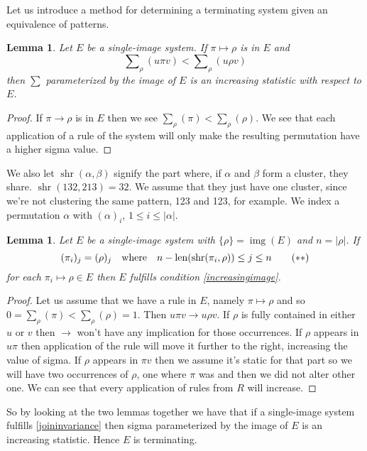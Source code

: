 \documentclass[openany, a4paper, 11pt, english]{article}
\newcommand{\patternrule}{ \mapsto \!}
\newtheorem{lemma}[theorem]{Lemma}
\theoremstyle{definition}
\DeclareMathOperator{\img}{img}
\DeclareMathOperator{\len}{len}
\DeclareMathOperator{\shr}{shr}
\begin{document}
Let us introduce a method for determining a terminating system given an
equivalence of patterns.

\begin{lemma}
    Let $E$ be a single-image system. If $\pi \patternrule \rho$ is in $E$ and 
    \[
        \sum\nolimits_\rho(u\pi v) < \sum\nolimits_\rho(u \rho v) \tag{$\ast$}
        \label{increasingimage}
    \]
    then $\sum$ parameterized by the image of $E$ is an increasing statistic
    with respect to $E$.
\end{lemma}
\begin{proof}
    If $\pi \to \rho$ is in $E$ then we see $\sum_\rho(\pi) <
    \sum_\rho(\rho)$.  We see that each application of a rule of the system
    will only make the resulting permutation have a higher sigma value.
\end{proof}

 We also let $\shr(\alpha,
\beta)$ signify the part where, if $\alpha$ and $\beta$ form a cluster, they
share. $\shr(132, 213) = 32$. We assume that they just have one cluster, since
we're not clustering the same pattern, 123 and 123, for example. We index a
permutation $\alpha$ with $(\alpha)_i$, $1 \leq i \leq |\alpha|$.

\begin{lemma}
    Let $E$ be a single-image system with $\{\rho\} = \img(E)$ and $n = |\rho|$. If
    \[
        (\pi_i)_j = (\rho)_j \quad \textnormal{where} \quad n-\len(\shr(\pi_i,
        \rho)) \leq j \leq n \tag{$\ast\ast$} \label{joininvariance}
    \]
    for each $\pi_i \patternrule \rho \in E$ then $E$ fulfills condition
    \eqref{increasingimage}. \end{lemma}
\begin{proof}
    Let us assume that we have a rule in $E$, namely $\pi \patternrule \rho$ and so
    $0 = \sum_\rho(\pi) < \sum_\rho(\rho) = 1$. Then $u \pi v \to u \rho v$. 
    If $\rho$ is fully contained in either $u$ or $v$ then $\to$ won't have any
    implication for those occurrences. If $\rho$ appears in $u\pi$ then
    application of the rule will move it further to the right, increasing the
    value of sigma. If $\rho$ appears in $\pi v$ then we assume it's static for
    that part so we will have two occurrences of $\rho$, one where $\pi$ was and
    then we did not alter other one.
    We can see that every application of rules from $R$ will increase.
\end{proof}

So by looking at the two lemmas together we have that if a single-image system
fulfills \eqref{joininvariance} then sigma parameterized by the image of $E$ is
an increasing statistic. Hence $E$ is terminating.
\end{document}
